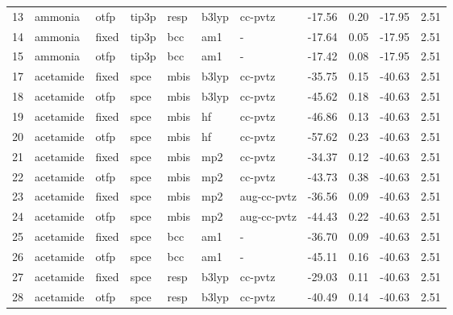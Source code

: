 \begin{tabular}{lllllllrrrr}
13  &                       ammonia &   otfp &  tip3p &   resp &   b3lyp &      cc-pvtz &      -17.56 &     0.20 &      -17.95 &      2.51 \\
14  &                       ammonia &  fixed &  tip3p &    bcc &     am1 &            - &      -17.64 &     0.05 &      -17.95 &      2.51 \\
15  &                       ammonia &   otfp &  tip3p &    bcc &     am1 &            - &      -17.42 &     0.08 &      -17.95 &      2.51 \\
17  &                     acetamide &  fixed &   spce &   mbis &   b3lyp &      cc-pvtz &      -35.75 &     0.15 &      -40.63 &      2.51 \\
18  &                     acetamide &   otfp &   spce &   mbis &   b3lyp &      cc-pvtz &      -45.62 &     0.18 &      -40.63 &      2.51 \\
19  &                     acetamide &  fixed &   spce &   mbis &      hf &      cc-pvtz &      -46.86 &     0.13 &      -40.63 &      2.51 \\
20  &                     acetamide &   otfp &   spce &   mbis &      hf &      cc-pvtz &      -57.62 &     0.23 &      -40.63 &      2.51 \\
21  &                     acetamide &  fixed &   spce &   mbis &     mp2 &      cc-pvtz &      -34.37 &     0.12 &      -40.63 &      2.51 \\
22  &                     acetamide &   otfp &   spce &   mbis &     mp2 &      cc-pvtz &      -43.73 &     0.38 &      -40.63 &      2.51 \\
23  &                     acetamide &  fixed &   spce &   mbis &     mp2 &  aug-cc-pvtz &      -36.56 &     0.09 &      -40.63 &      2.51 \\
24  &                     acetamide &   otfp &   spce &   mbis &     mp2 &  aug-cc-pvtz &      -44.43 &     0.22 &      -40.63 &      2.51 \\
25  &                     acetamide &  fixed &   spce &    bcc &     am1 &            - &      -36.70 &     0.09 &      -40.63 &      2.51 \\
26  &                     acetamide &   otfp &   spce &    bcc &     am1 &            - &      -45.11 &     0.16 &      -40.63 &      2.51 \\
27  &                     acetamide &  fixed &   spce &   resp &   b3lyp &      cc-pvtz &      -29.03 &     0.11 &      -40.63 &      2.51 \\
28  &                     acetamide &   otfp &   spce &   resp &   b3lyp &      cc-pvtz &      -40.49 &     0.14 &      -40.63 &      2.51 \\

\end{tabular}
